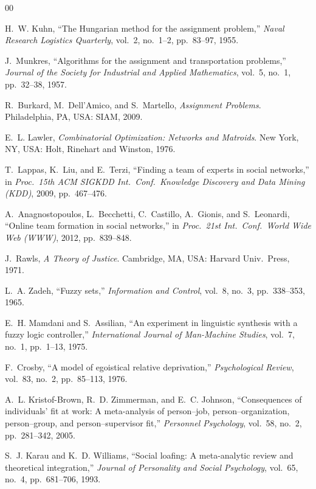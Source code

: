 \documentclass[conference]{IEEEtran}
\begin{document}
\begin{thebibliography}{00}

 H.~W. Kuhn, ``The Hungarian method for the assignment
problem,'' \emph{Naval Research Logistics Quarterly}, vol.~2, no.~1--2,
pp.~83--97, 1955.

 J.~Munkres, ``Algorithms for the assignment and
transportation problems,'' \emph{Journal of the Society for Industrial and
Applied Mathematics}, vol.~5, no.~1, pp.~32--38, 1957.

 R.~Burkard, M.~Dell'Amico, and S.~Martello,
\emph{Assignment Problems}. Philadelphia, PA, USA: SIAM, 2009.

 E.~L. Lawler, \emph{Combinatorial Optimization: Networks and
Matroids}. New York, NY, USA: Holt, Rinehart and Winston, 1976.

 T.~Lappas, K.~Liu, and E.~Terzi, ``Finding a team of experts
in social networks,'' in \emph{Proc.\ 15th ACM SIGKDD Int.\ Conf.\ Knowledge
Discovery and Data Mining (KDD)}, 2009, pp.~467--476.

 A.~Anagnostopoulos, L.~Becchetti, C.~Castillo,
A.~Gionis, and S.~Leonardi, ``Online team formation in social networks,'' in
\emph{Proc.\ 21st Int.\ Conf.\ World Wide Web (WWW)}, 2012, pp.~839--848.

 J.~Rawls, \emph{A Theory of Justice}. Cambridge, MA, USA:
Harvard Univ.\ Press, 1971.

 L.~A. Zadeh, ``Fuzzy sets,'' \emph{Information and Control},
vol.~8, no.~3, pp.~338--353, 1965.

 E.~H. Mamdani and S.~Assilian, ``An experiment in
linguistic synthesis with a fuzzy logic controller,'' \emph{International Journal
of Man-Machine Studies}, vol.~7, no.~1, pp.~1--13, 1975.

 F.~Crosby, ``A model of egoistical relative deprivation,''
\emph{Psychological Review}, vol.~83, no.~2, pp.~85--113, 1976.

 A.~L. Kristof-Brown, R.~D. Zimmerman, and E.~C. Johnson,
``Consequences of individuals' fit at work: A meta-analysis of person--job,
person--organization, person--group, and person--supervisor fit,''
\emph{Personnel Psychology}, vol.~58, no.~2, pp.~281--342, 2005.

 S.~J. Karau and K.~D. Williams, ``Social loafing: A
meta-analytic review and theoretical integration,'' \emph{Journal of Personality
and Social Psychology}, vol.~65, no.~4, pp.~681--706, 1993.


\end{thebibliography}
\end{document}

